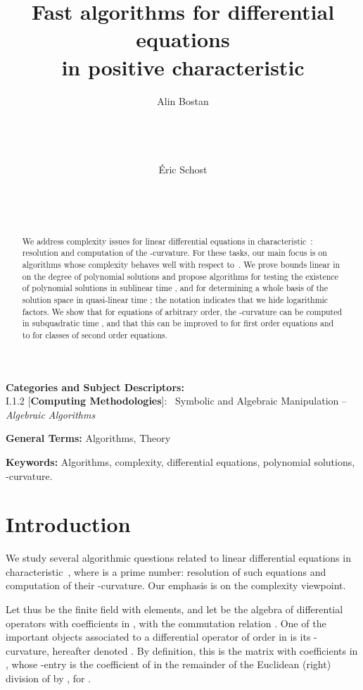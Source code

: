 \documentclass{sig-alternate}
\title{Fast algorithms for differential equations \\ in positive characteristic}
\author{
\alignauthor Alin Bostan\\
\affaddr{Algorithms Project}\\
\affaddr{INRIA Rocquencourt}\\ 
\affaddr{France}\\
\affaddr{78153 Le Chesnay Cedex France}\\
\alignauthor \'Eric Schost\\
\affaddr{ORCCA and Computer Science Department}\\
\affaddr{The University of Western Ontario}\\
\affaddr{London, ON, Canada}\\
\affaddr{eschost@uwo.ca} 
}
\begin{document}
\maketitle
\begin{abstract} 
We address complexity issues for linear differential equations in characteristic~: resolution and computation of the -curvature. For these tasks, our main focus is on algorithms whose complexity behaves well with respect to~. We prove bounds linear in  on the degree of polynomial solutions and propose algorithms for testing the existence of polynomial solutions in sublinear time , and for determining a whole basis of the solution space in quasi-linear time ; the  notation indicates that we hide logarithmic factors. We show that for equations of arbitrary order, the -curvature can be computed in subquadratic time , and that this can be improved to  for first order equations and to  for classes of second order equations.  
\end{abstract}



\vspace{1mm}
 \noindent
 {\bf Categories and Subject Descriptors:} \\
\noindent I.1.2 [{\bf Computing Methodologies}]:{~} Symbolic and Algebraic
  Manipulation -- \emph{Algebraic Algorithms}
 
 \vspace{1mm}
 \noindent
 {\bf General Terms:} Algorithms, Theory
 
 \vspace{1mm}
 \noindent
 {\bf Keywords:} Algorithms, complexity, differential equations, polynomial solutions, -curvature.



\medskip

\section{Introduction}\label{sec:intro}

\noindent We study several algorithmic questions related to linear
differential equations in characteristic~, where  is a prime
number: resolution of such equations and computation of their
-curvature. Our emphasis is on the complexity viewpoint.

Let thus  be the finite field with  elements, and let  be the algebra of differential operators with
coefficients in , with the commutation relation . One of the important objects associated to a
differential operator  of order  in  is its -curvature, hereafter denoted . By
definition, this is the  matrix with coefficients in
, whose -entry is the coefficient of  in
the remainder of the Euclidean (right) division of  by
, for .
\end{document}
